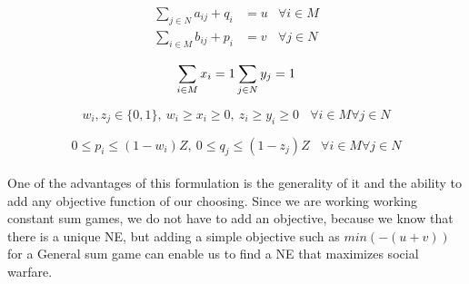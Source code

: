 \documentclass[11pt]{article}
\begin{document}
\begin{align*} 
\sum_{j \in N} a_{ij} + q_i &= u & \forall i \in M \\ 
\sum_{i \in M} b_{ij} + p_i &= v & \forall j \in N
\end{align*}

\begin{equation}
\sum_{i \in M} x_i = 1 \sum_{j \in N} y_j = 1\\ 
\end{equation}

\begin{equation}
w_i, z_j \in \{0,1\}, \ w_i \geq x_i \geq 0, \ z_i \geq y_i \geq 0 \ \ \ \ \forall i \in M \forall j \in N
\end{equation}

\begin{equation}
0 \leq p_i \leq (1 - w_i)Z, \ 0 \leq q_j \leq(1-z_j)Z \ \ \ \ \forall i \in M \forall j \in N
\end{equation} \\

One of the advantages of this formulation is the generality of it and the ability to add any objective function of our choosing. 
Since we are working working constant sum games, we do not have to add an objective, because we know that there is a unique NE, but adding a simple objective such as $min(-(u+v))$ for a General sum game can enable us to find a NE that maximizes social warfare. 
\end{document}
